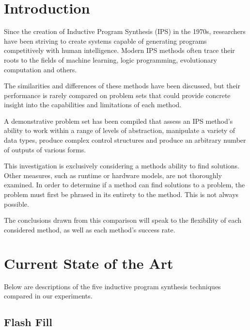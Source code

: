 \section{Introduction}

Since the creation of Inductive Program Synthesis (IPS) in the 1970s\cite{Kitzelmann2009}, researchers have been striving to create systems capable of generating programs competitively with human intelligence. Modern IPS methods often trace their roots to the fields of machine learning, logic programming, evolutionary computation and others.

The similarities and differences of these methods have been discussed\cite{Kitzelmann2009}, but their performance is rarely compared on problem sets that could provide concrete insight into the capabilities and limitations of each method.

A demonstrative problem set has been compiled that assess an IPS method's ability to work within a range of levels of abstraction\cite{Gaunt2016}, manipulate a variety of data types, produce complex control structures and produce an arbitrary number of outputs of various forms\cite{Helmuth2015b}.


This investigation is exclusively considering a methods ability to find solutions. Other measures, such as runtime or hardware models, are not thoroughly examined. In order to determine if a method can find solutions to a problem, the problem must first be phrased in its entirety to the method. This is not always possible.

The conclusions drawn from this comparison will speak to the flexibility of each considered method, as well as each method's success rate.

\section{Current State of the Art}

Below are descriptions of the five inductive program synthesis techniques compared in our experiments.


\subsection{Flash Fill}

